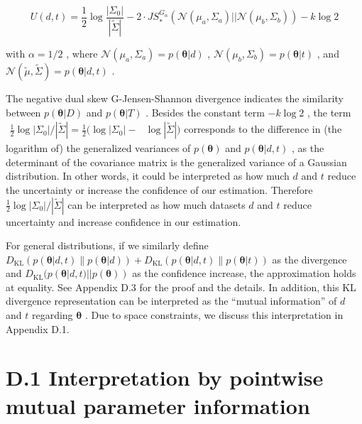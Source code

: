 \[
U ( d , t ) = \frac { 1 } { 2 } \log \frac { | \Sigma _ { 0 } | } { | \widetilde { \Sigma } | } - 2 \cdot J S _ { * } ^ { G _ { \alpha } } ( \mathcal { N } ( \mu _ { a } , \Sigma _ { a } ) | | \mathcal { N } ( \mu _ { b } , \Sigma _ { b } ) ) - k \log 2
\]

with \(\alpha = 1 / 2\) , where
\(\mathcal { N } ( \mu _ { a } , \Sigma _ { a } ) = p ( \pmb { \theta } | d )\)
,
\(\mathcal { N } ( \mu _ { b } , \Sigma _ { b } ) = p ( \pmb { \theta } | t )\)
, and
\(\mathcal { N } ( \widetilde { \mu } , \widetilde { \Sigma } ) = p ( \pmb { \theta } | d , t )\)
.

The negative dual skew G-Jensen-Shannon divergence indicates the
similarity between \(p ( \pmb { \theta } | D )\) and
\(p ( \pmb \theta | T )\) . Besides the constant term \(- k \log 2\) ,
the term
\(\begin{array} { r } { \frac { 1 } { 2 } \log | \Sigma _ { 0 } | / | \widetilde \Sigma | = \frac { 1 } { 2 } ( \log | \Sigma _ { 0 } | - } \end{array}\)
\(\log | \widetilde { \Sigma } | )\) corresponds to the difference in
(the logarithm of) the generalized veariances of \(p ( \pmb \theta )\)
and \(p ( \pmb \theta | d , t )\) , as the determinant of the covariance
matrix is the generalized variance of a Gaussian distribution. In other
words, it could be interpreted as how much \(d\) and \(t\) reduce the
uncertainty or increase the confidence of our estimation. Therefore
\(\frac { 1 } { 2 } \log | \Sigma _ { 0 } | / | \widetilde { \Sigma } |\)
can be interpreted as how much datasets \(d\) and \(t\) reduce
uncertainty and increase confidence in our estimation.

For general distributions, if we similarly define
\(D _ { \mathrm { K L } } ( p ( \pmb \theta | d , t ) \lVert p ( \pmb \theta | d ) ) + D _ { \mathrm { K L } } ( p ( \pmb \theta | d , t ) \lVert p ( \pmb \theta | t ) )\)
as the divergence and
\(D _ { \mathrm { K L } } ( p ( \pmb { \theta } | d , t ) | | p ( \pmb { \theta } ) )\)
as the confidence increase, the approximation holds at equality. See
Appendix D.3 for the proof and the details. In addition, this KL
divergence representation can be interpreted as the ``mutual
information'' of \(d\) and \(t\) regarding \(\pmb \theta\) . Due to
space constraints, we discuss this interpretation in Appendix D.1.

\section{D.1 Interpretation by pointwise mutual parameter
information}\label{d.1-interpretation-by-pointwise-mutual-parameter-information}

